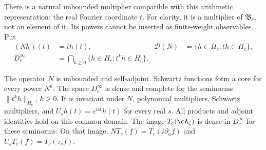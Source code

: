 There is a natural unbounded multiplier compatible with this arithmetic
representation: the real Fourier coordinate $t$.
For clarity, it is a multiplier of $\mathfrak B_c$, not an element of it.
Its powers cannot be inserted as finite-weight observables.
Put
\begin{equation}
 \begin{aligned}
 (Nh)(t)&=t h(t),&
 \mathcal D(N)&=\{h\in H_c:t h\in H_c\},\\
 D_c^\infty&=\bigcap_{k\geq0}\{h\in H_c:t^k h\in H_c\}.&&
 \end{aligned}
 \label{eq:wp-moment-domain}
\end{equation}

\begin{proposition}
\label{prop:wp-domain}
The operator $N$ is unbounded and self-adjoint.
Schwartz functions form a core for every power $N^k$.
The space $D_c^\infty$ is dense and complete for the seminorms
$\|t^k h\|_{H_c}$, $k\geq0$.
It is invariant under $N$, polynomial multipliers, Schwartz multipliers,
and $U_s h(t)=e^{ist}h(t)$ for every real $s$.
All products and adjoint identities hold on this common domain.
The image $T_c(\cA_\zeta)$ is dense in $D_c^\infty$ for these seminorms.
On that image, $N T_c(f)=T_c(i\partial_u f)$ and
$U_s T_c(f)=T_c(\tau_s f)$.
\end{proposition}

